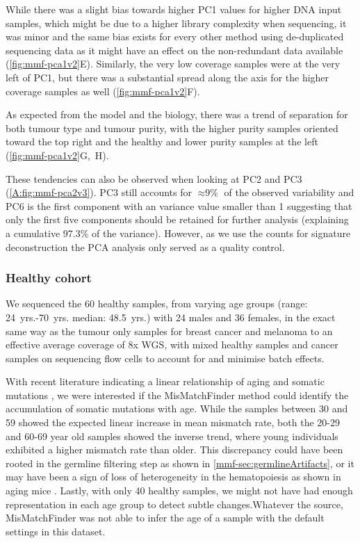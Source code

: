 While there was a slight bias towards higher PC1 values for higher DNA input samples, which might be due to a higher library complexity when sequencing, it was minor and the same bias exists for every other method using de-duplicated sequencing data as it might have an effect on the non-redundant data available (\autoref{fig:mmf-pca1v2}E). Similarly, the very low coverage samples were at the very left of PC1, but there was a substantial spread along the axis for the higher coverage samples as well (\autoref{fig:mmf-pca1v2}F). 

As expected from the model and the biology, there was a trend of separation for both tumour type and tumour purity, with the higher purity samples oriented toward the top right and the healthy and lower purity samples at the left (\autoref{fig:mmf-pca1v2}G,~H).

These tendencies can also be observed when looking at PC2 and PC3 (\autoref{A:fig:mmf-pca2v3}). PC3 still accounts for $\approx \text{9\%}$ of the observed variability and PC6 is the first component with an variance value smaller than 1 suggesting that only the first five components should be retained for further analysis (explaining a cumulative 97.3\% of the variance). However, as we use the counts for signature deconstruction the PCA analysis only served as a quality control.


\subsubsection{Healthy cohort}
\label{mmf-sec:healthy}

We sequenced the 60 healthy samples, from varying age groups (range: \num{24}~yrs.-\num{70}~yrs. median: \num{48.5}~yrs.) with 24 males and 36 females, in the exact same way as the tumour only samples for breast cancer and melanoma to an effective average coverage of 8x WGS, with mixed healthy samples and cancer samples on sequencing flow cells to account for and minimise batch effects.

With recent literature indicating a linear relationship of aging and somatic mutations \cite{Martincorena2018,Abascal2021,Cagan2022}, we were interested if the MisMatchFinder method could identify the accumulation of  somatic mutations with age. While the samples between 30 and 59 showed the expected linear increase in mean mismatch rate, both the 20-29 and 60-69 year old samples showed the inverse trend, where young individuals exhibited a higher mismatch rate than older. This discrepancy could have been rooted in the germline filtering step as shown in \autoref{mmf-sec:germlineArtifacts}, or it may have been a sign of loss of heterogeneity in the hematopoiesis as shown in aging mice \cite{Ganuza2019}. Lastly, with only 40 healthy samples, we might not have had enough representation in each age group to detect subtle changes.Whatever the source, MisMatchFinder was not able to infer the age of a sample with the default settings in this dataset.

